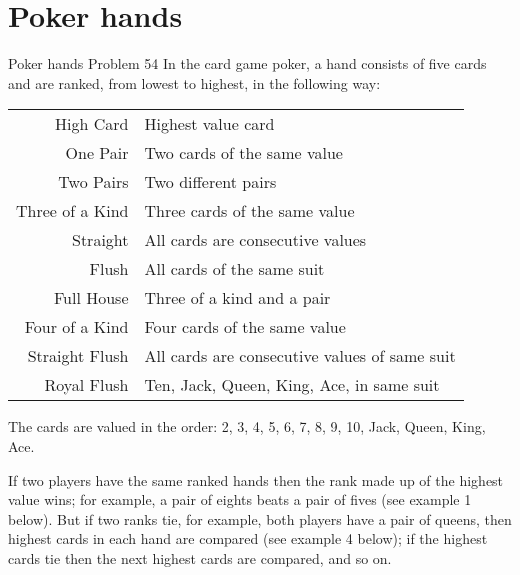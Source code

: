 \chapter{Poker hands}
Poker hands
Problem 54
In the card game poker, a hand consists of five cards and are ranked, from lowest to highest, in the following way:

\noindent
\begin{tablebox}

	{
		\begin{tabularx}{\textwidth}{rX}

			High Card       & Highest value card                            \\

			One Pair        & Two cards of the same value                   \\

			Two Pairs       & Two different pairs                           \\

			Three of a Kind & Three cards of the same value                 \\

			Straight        & All cards are consecutive values              \\

			Flush           & All cards of the same suit                    \\

			Full House      & Three of a kind and a pair                    \\

			Four of a Kind  & Four cards of the same value                  \\

			Straight Flush  & All cards are consecutive values of same suit \\

			Royal Flush     & Ten, Jack, Queen, King, Ace, in same suit     \\
		\end{tabularx}
	}
\end{tablebox}


The cards are valued in the order:
2, 3, 4, 5, 6, 7, 8, 9, 10, Jack, Queen, King, Ace.

If two players have the same ranked hands then the rank made up of the highest value wins; for example, a pair of eights
beats a pair of fives (see example 1 below). But if two ranks tie, for example, both players have a pair of queens, then
highest cards in each hand are compared (see example 4 below); if the highest cards tie then the next highest cards are
compared, and so on.

